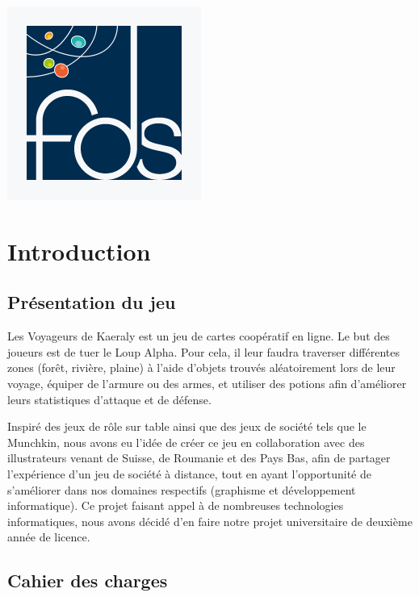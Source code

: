 \documentclass[12pt]{report}
\begin{document}
\begin{titlepage}
\begin{center}
			\vfill
				
			\includegraphics[scale=0.3]{logo-fds.jpg}~	
				
		\end{center}
	\end{titlepage}
	
\tableofcontents

\chapter*{Introduction}
    
    \section*{Présentation du jeu}
    
    Les Voyageurs de Kaeraly est un jeu de cartes coopératif en ligne. Le but des joueurs est de tuer le Loup Alpha. Pour cela, il leur faudra traverser différentes zones (forêt, rivière, plaine) à l'aide d'objets trouvés aléatoirement lors de leur voyage, équiper de l'armure ou des armes, et utiliser des potions afin d'améliorer leurs statistiques d'attaque et de défense. 
    
    
    Inspiré des jeux de rôle sur table ainsi que des jeux de société tels que le Munchkin, nous avons eu l'idée de créer ce jeu en collaboration avec des illustrateurs venant de Suisse, de Roumanie et des Pays Bas, afin de partager l'expérience d'un jeu de société à distance, tout en ayant l'opportunité de s'améliorer dans nos domaines respectifs (graphisme et développement informatique). Ce projet faisant appel à de nombreuses technologies informatiques, nous avons décidé d'en faire notre projet universitaire de deuxième année de licence.
    
    \section*{Cahier des charges}
    
\end{document}
